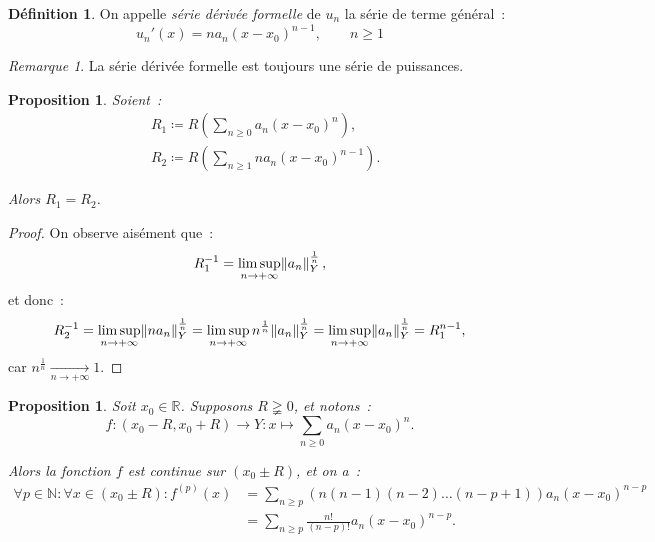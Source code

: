 \documentclass{report}
\newtheorem{prp}[thm]{Proposition}
\theoremstyle{definition}
\newtheorem{déf}[thm]{Définition}
\theoremstyle{remark}
\newtheorem*{rmq}{Remarque}
\numberwithin{equation}{section}
\newcommand{\R}{\mathbb R}
\newcommand{\N}{\mathbb N}
\newcommand{\pinfty}{{+\infty}}
\begin{document}
			\begin{déf} On appelle \textit{série dérivée formelle} de $u_n$ la série de terme général~:
			\begin{equation}
				u_n'(x) = na_n(x-x_0)^{n-1}, \qquad n \geq 1
			\end{equation}
			\end{déf}

			\begin{rmq} La série dérivée formelle est toujours une série de puissances.
			\end{rmq}

			\begin{prp} Soient~:
			\begin{align}
				&R_1 \coloneqq R\left(\sum_{n \geq 0}a_n(x-x_0)^n\right), \\
				&R_2 \coloneqq R\left(\sum_{n \geq 1}na_n(x-x_0)^{n-1}\right).
			\end{align}

			Alors $R_1 = R_2$.
			\end{prp}

			\begin{proof} On observe aisément que~:
			\begin{equation}
				R_1^{-1} = \limsup_{n \to \pinfty}\norm {a_n}_Y^{\frac 1n},
			\end{equation}
			et donc~:
			\begin{equation}
				R_2^{-1} = \limsup_{n \to \pinfty}\norm {na_n}_Y^{\frac 1n} = \limsup_{n \to \pinfty}n^{\frac 1n}\norm {a_n}_Y^{\frac 1n}
				= \limsup_{n \to \pinfty}\norm {a_n}_Y^{\frac 1n} = R_1^{n-1},
			\end{equation}
			car $n^{\frac 1n} \xrightarrow[n \to \pinfty]{} 1$.
			\end{proof}

			\begin{prp}\label{prp:formuledérivéepsdp} Soit $x_0 \in \R$. Supposons $R \gneqq 0$, et notons~:
			\begin{equation}
				f : (x_0-R, x_0+R) \to Y : x \mapsto \sum_{n \geq 0}a_n(x-x_0)^n.
			\end{equation}

			Alors la fonction $f$ est continue sur $(x_0 \pm R)$, et on a~:
			\begin{align}
				\forall p \in \N : \forall x \in (x_0 \pm R) : f^{(p)}(x) &= \sum_{n \geq p}\left(n(n-1)(n-2)\ldots(n-p+1)\right)a_n(x-x_0)^{n-p} \\
				&= \sum_{n \geq p}\frac {n!}{(n-p)!}a_n(x-x_0)^{n-p}.
			\end{align}
			\end{prp}
\end{document}
